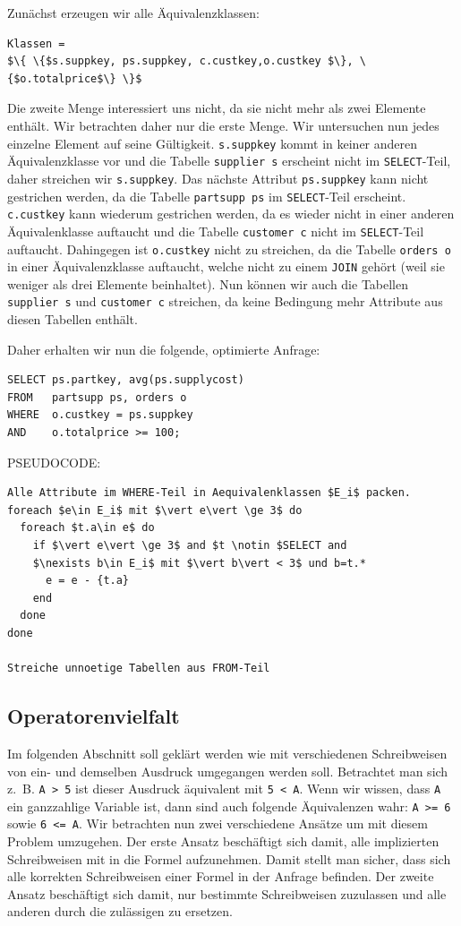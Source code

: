 Zunächst erzeugen wir alle Äquivalenzklassen:
\begin{lstlisting}[mathescape]
Klassen = 
$\{ \{$s.suppkey, ps.suppkey, c.custkey,o.custkey $\}, \{$o.totalprice$\} \}$
\end{lstlisting}

Die zweite Menge interessiert uns nicht, da sie nicht mehr als zwei Elemente enthält. Wir betrachten daher nur die erste Menge. Wir untersuchen nun jedes einzelne Element auf seine Gültigkeit. \verb|s.suppkey| kommt in keiner anderen Äquivalenzklasse vor und die Tabelle \verb|supplier s| erscheint nicht im \verb|SELECT|-Teil, daher streichen wir \verb|s.suppkey|. Das nächste Attribut \verb|ps.suppkey| kann nicht gestrichen werden, da die Tabelle \verb|partsupp ps| im \verb|SELECT|-Teil erscheint. \verb|c.custkey| kann wiederum gestrichen werden, da es wieder nicht in einer anderen Äquivalenklasse auftaucht und die Tabelle \verb|customer c| nicht im \verb|SELECT|-Teil auftaucht. Dahingegen ist \verb|o.custkey| nicht zu streichen, da die Tabelle \verb|orders o| in einer Äquivalenzklasse auftaucht, welche nicht zu einem \verb|JOIN| gehört (weil sie weniger als drei Elemente beinhaltet). Nun können wir auch die Tabellen \verb|supplier s| und \verb|customer c| streichen, da keine Bedingung mehr Attribute aus diesen Tabellen enthält.

Daher erhalten wir nun die folgende, optimierte Anfrage:
\begin{lstlisting}[mathescape]
SELECT ps.partkey, avg(ps.supplycost)
FROM   partsupp ps, orders o
WHERE  o.custkey = ps.suppkey 
AND    o.totalprice >= 100;
\end{lstlisting}

PSEUDOCODE:

\begin{lstlisting}[mathescape]
Alle Attribute im WHERE-Teil in Aequivalenklassen $E_i$ packen.
foreach $e\in E_i$ mit $\vert e\vert \ge 3$ do
  foreach $t.a\in e$ do
    if $\vert e\vert \ge 3$ and $t \notin $SELECT and 
    $\nexists b\in E_i$ mit $\vert b\vert < 3$ und b=t.*
      e = e - {t.a}
    end
  done
done

Streiche unnoetige Tabellen aus FROM-Teil 
\end{lstlisting}

\subsection{Operatorenvielfalt}

Im folgenden Abschnitt soll geklärt werden wie mit verschiedenen Schreibweisen von ein- und demselben Ausdruck umgegangen werden soll. Betrachtet man sich \mbox{z. B.} \verb|A > 5| ist dieser Ausdruck äquivalent mit \verb|5 < A|. Wenn wir wissen, dass \verb|A| ein ganzzahlige Variable ist, dann sind auch folgende Äquivalenzen wahr: \verb|A >= 6| sowie \verb|6 <= A|. Wir betrachten nun zwei verschiedene Ansätze um mit diesem Problem umzugehen. Der erste Ansatz beschäftigt sich damit, alle implizierten Schreibweisen mit in die Formel aufzunehmen. Damit stellt man sicher, dass sich alle korrekten Schreibweisen einer Formel in der Anfrage befinden. Der zweite Ansatz beschäftigt sich damit, nur bestimmte Schreibweisen zuzulassen und alle anderen durch die zulässigen zu ersetzen.

